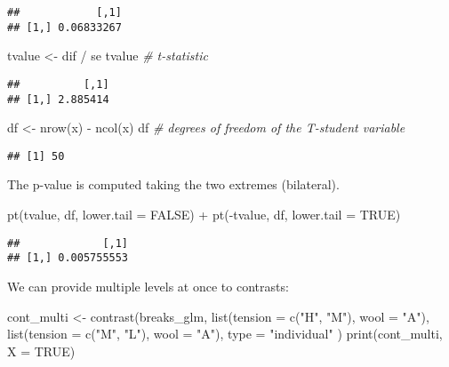\documentclass[
  oneside]{book}
\newenvironment{Shaded}{\begin{snugshade}}{\end{snugshade}}
\newcommand{\AttributeTok}[1]{\textcolor[rgb]{0.77,0.63,0.00}{#1}}
\newcommand{\CommentTok}[1]{\textcolor[rgb]{0.56,0.35,0.01}{\textit{#1}}}
\newcommand{\ConstantTok}[1]{\textcolor[rgb]{0.00,0.00,0.00}{#1}}
\newcommand{\FunctionTok}[1]{\textcolor[rgb]{0.00,0.00,0.00}{#1}}
\newcommand{\NormalTok}[1]{#1}
\newcommand{\OtherTok}[1]{\textcolor[rgb]{0.56,0.35,0.01}{#1}}
\newcommand{\SpecialCharTok}[1]{\textcolor[rgb]{0.00,0.00,0.00}{#1}}
\newcommand{\StringTok}[1]{\textcolor[rgb]{0.31,0.60,0.02}{#1}}
\begin{document}
\begin{verbatim}
##            [,1]
## [1,] 0.06833267
\end{verbatim}

\begin{Shaded}
\begin{Highlighting}[]
\NormalTok{tvalue }\OtherTok{\textless{}{-}}\NormalTok{ dif }\SpecialCharTok{/}\NormalTok{ se}
\NormalTok{tvalue }\CommentTok{\# t{-}statistic}
\end{Highlighting}
\end{Shaded}

\begin{verbatim}
##          [,1]
## [1,] 2.885414
\end{verbatim}

\begin{Shaded}
\begin{Highlighting}[]
\NormalTok{df }\OtherTok{\textless{}{-}} \FunctionTok{nrow}\NormalTok{(x) }\SpecialCharTok{{-}} \FunctionTok{ncol}\NormalTok{(x)}
\NormalTok{df }\CommentTok{\# degrees of freedom of the T{-}student variable}
\end{Highlighting}
\end{Shaded}

\begin{verbatim}
## [1] 50
\end{verbatim}

The p-value is computed taking the two extremes (bilateral).

\begin{Shaded}
\begin{Highlighting}[]
\FunctionTok{pt}\NormalTok{(tvalue, df, }\AttributeTok{lower.tail =} \ConstantTok{FALSE}\NormalTok{) }\SpecialCharTok{+} \FunctionTok{pt}\NormalTok{(}\SpecialCharTok{{-}}\NormalTok{tvalue, df, }\AttributeTok{lower.tail =} \ConstantTok{TRUE}\NormalTok{)}
\end{Highlighting}
\end{Shaded}

\begin{verbatim}
##             [,1]
## [1,] 0.005755553
\end{verbatim}

We can provide multiple levels at once to contrasts:

\begin{Shaded}
\begin{Highlighting}[]
\NormalTok{cont\_multi }\OtherTok{\textless{}{-}} \FunctionTok{contrast}\NormalTok{(breaks\_glm,}
  \FunctionTok{list}\NormalTok{(}\AttributeTok{tension =} \FunctionTok{c}\NormalTok{(}\StringTok{"H"}\NormalTok{, }\StringTok{"M"}\NormalTok{), }\AttributeTok{wool =} \StringTok{"A"}\NormalTok{),}
  \FunctionTok{list}\NormalTok{(}\AttributeTok{tension =} \FunctionTok{c}\NormalTok{(}\StringTok{"M"}\NormalTok{, }\StringTok{"L"}\NormalTok{), }\AttributeTok{wool =} \StringTok{"A"}\NormalTok{),}
  \AttributeTok{type =} \StringTok{"individual"}
\NormalTok{)}
\FunctionTok{print}\NormalTok{(cont\_multi, }\AttributeTok{X =} \ConstantTok{TRUE}\NormalTok{)}
\end{Highlighting}
\end{Shaded}
\end{document}
